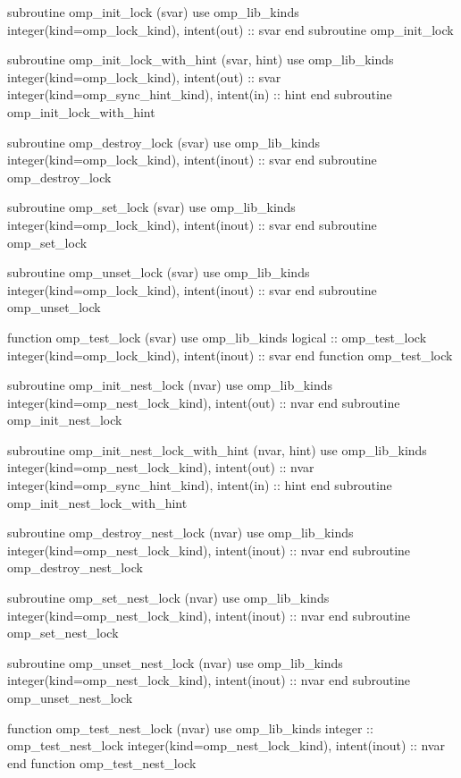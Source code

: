 {\begin{ompfFunction}
    subroutine omp_init_lock (svar)
      use omp_lib_kinds
      integer(kind=omp_lock_kind), intent(out) :: svar
    end subroutine omp_init_lock

    subroutine omp_init_lock_with_hint (svar, hint)
      use omp_lib_kinds
      integer(kind=omp_lock_kind), intent(out) :: svar
      integer(kind=omp_sync_hint_kind), intent(in) :: hint
    end subroutine omp_init_lock_with_hint

    subroutine omp_destroy_lock (svar)
      use omp_lib_kinds
      integer(kind=omp_lock_kind), intent(inout) :: svar
    end subroutine omp_destroy_lock

    subroutine omp_set_lock (svar)
      use omp_lib_kinds
      integer(kind=omp_lock_kind), intent(inout) :: svar
    end subroutine omp_set_lock

    subroutine omp_unset_lock (svar)
      use omp_lib_kinds
      integer(kind=omp_lock_kind), intent(inout) :: svar
    end subroutine omp_unset_lock

    function omp_test_lock (svar)
      use omp_lib_kinds
      logical :: omp_test_lock
      integer(kind=omp_lock_kind), intent(inout) :: svar
    end function omp_test_lock

    subroutine omp_init_nest_lock (nvar)
      use omp_lib_kinds
      integer(kind=omp_nest_lock_kind), intent(out) :: nvar
    end subroutine omp_init_nest_lock

    subroutine omp_init_nest_lock_with_hint (nvar, hint)
      use omp_lib_kinds
      integer(kind=omp_nest_lock_kind), intent(out) :: nvar
      integer(kind=omp_sync_hint_kind), intent(in) :: hint
    end subroutine omp_init_nest_lock_with_hint

    subroutine omp_destroy_nest_lock (nvar)
      use omp_lib_kinds
      integer(kind=omp_nest_lock_kind), intent(inout) :: nvar
    end subroutine omp_destroy_nest_lock

    subroutine omp_set_nest_lock (nvar)
      use omp_lib_kinds
      integer(kind=omp_nest_lock_kind), intent(inout) :: nvar
    end subroutine omp_set_nest_lock

    subroutine omp_unset_nest_lock (nvar)
      use omp_lib_kinds
      integer(kind=omp_nest_lock_kind), intent(inout) :: nvar
    end subroutine omp_unset_nest_lock

    function omp_test_nest_lock (nvar)
      use omp_lib_kinds
      integer :: omp_test_nest_lock
      integer(kind=omp_nest_lock_kind), intent(inout) :: nvar
    end function omp_test_nest_lock


\end{ompfFunction}}
